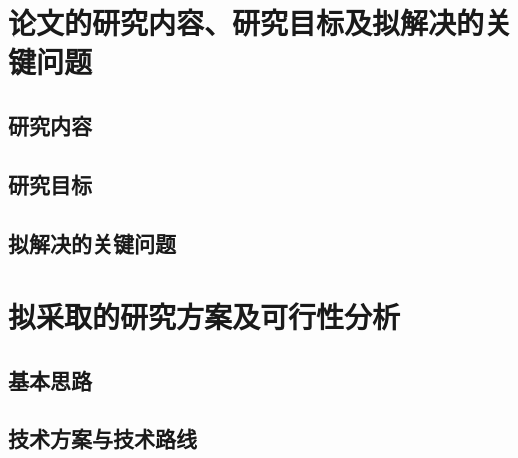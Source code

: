 \section{论文的研究内容、研究目标及拟解决的关键问题}

\subsection{研究内容}

\subsection{研究目标}

\subsection{拟解决的关键问题}



\section{拟采取的研究方案及可行性分析}

\subsection{基本思路}

\subsection{技术方案与技术路线}

